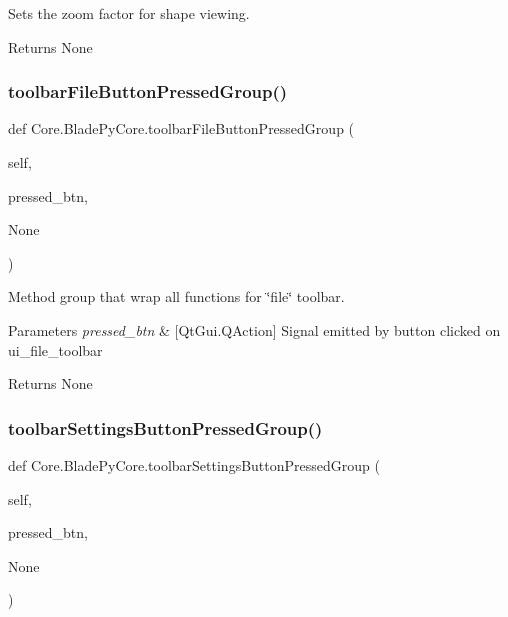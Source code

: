 Sets the zoom factor for shape viewing. 

\begin{DoxyReturn}{Returns}
None 
\end{DoxyReturn}
\hypertarget{a00081_ab5cf733dc40f2b17761056148fd51263}{}\label{a00081_ab5cf733dc40f2b17761056148fd51263} 
\subsubsection{\texorpdfstring{toolbar\+File\+Button\+Pressed\+Group()}{toolbarFileButtonPressedGroup()}}
{\footnotesize\ttfamily def Core.\+Blade\+Py\+Core.\+toolbar\+File\+Button\+Pressed\+Group (\begin{DoxyParamCaption}\item[{}]{self,  }\item[{}]{pressed\+\_\+btn,  }\item[{}]{None }\end{DoxyParamCaption})}



Method group that wrap all functions for \char`\"{}file\char`\"{} toolbar. 


\begin{DoxyParams}{Parameters}
{\em pressed\+\_\+btn} & \mbox{[}Qt\+Gui.\+Q\+Action\mbox{]} Signal emitted by button clicked on ui\+\_\+file\+\_\+toolbar \\
\hline
\end{DoxyParams}
\begin{DoxyReturn}{Returns}
None 
\end{DoxyReturn}
\hypertarget{a00081_abe6ec5c591c19b280f2e24bb198a1d6b}{}\label{a00081_abe6ec5c591c19b280f2e24bb198a1d6b} 
\subsubsection{\texorpdfstring{toolbar\+Settings\+Button\+Pressed\+Group()}{toolbarSettingsButtonPressedGroup()}}
{\footnotesize\ttfamily def Core.\+Blade\+Py\+Core.\+toolbar\+Settings\+Button\+Pressed\+Group (\begin{DoxyParamCaption}\item[{}]{self,  }\item[{}]{pressed\+\_\+btn,  }\item[{}]{None }\end{DoxyParamCaption})}



